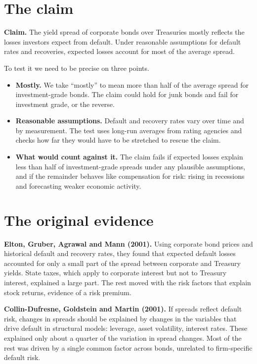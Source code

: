 \section{The claim}
\label{sec:17-claim}

\begin{callout}
\textbf{Claim.} The yield spread of corporate bonds over Treasuries mostly reflects the losses investors expect from default. Under reasonable assumptions for default rates and recoveries, expected losses account for most of the average spread.
\end{callout}

To test it we need to be precise on three points.

\begin{itemize}
  \item \textbf{Mostly.} We take ``mostly'' to mean more than half of the average spread for investment-grade bonds. The claim could hold for junk bonds and fail for investment grade, or the reverse.
  \item \textbf{Reasonable assumptions.} Default and recovery rates vary over time and by measurement. The test uses long-run averages from rating agencies and checks how far they would have to be stretched to rescue the claim.
  \item \textbf{What would count against it.} The claim fails if expected losses explain less than half of investment-grade spreads under any plausible assumptions, and if the remainder behaves like compensation for risk: rising in recessions and forecasting weaker economic activity.
\end{itemize}

\section{The original evidence}
\label{sec:17-evidence}

\textbf{Elton, Gruber, Agrawal and Mann (2001).} Using corporate bond prices and historical default and recovery rates, they found that expected default losses accounted for only a small part of the spread between corporate and Treasury yields. State taxes, which apply to corporate interest but not to Treasury interest, explained a large part. The rest moved with the risk factors that explain stock returns, evidence of a risk premium.

\textbf{Collin-Dufresne, Goldstein and Martin (2001).} If spreads reflect default risk, changes in spreads should be explained by changes in the variables that drive default in structural models: leverage, asset volatility, interest rates. These explained only about a quarter of the variation in spread changes. Most of the rest was driven by a single common factor across bonds, unrelated to firm-specific default risk.


